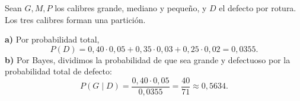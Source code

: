 Sean $G,M,P$ los calibres grande, mediano y pequeño, y $D$ el defecto por rotura. Los tres calibres forman una partición.

\textbf{a)} Por probabilidad total,
\[
P(D)=0{,}40\cdot0{,}05+0{,}35\cdot0{,}03+0{,}25\cdot0{,}02
=\boxed{0{,}0355}.
\]
\textbf{b)} Por Bayes, dividimos la probabilidad de que sea grande y defectuoso por la probabilidad total de defecto:
\[
P(G\mid D)=\frac{0{,}40\cdot0{,}05}{0{,}0355}=\boxed{\frac{40}{71}}\approx 0{,}5634.
\]
